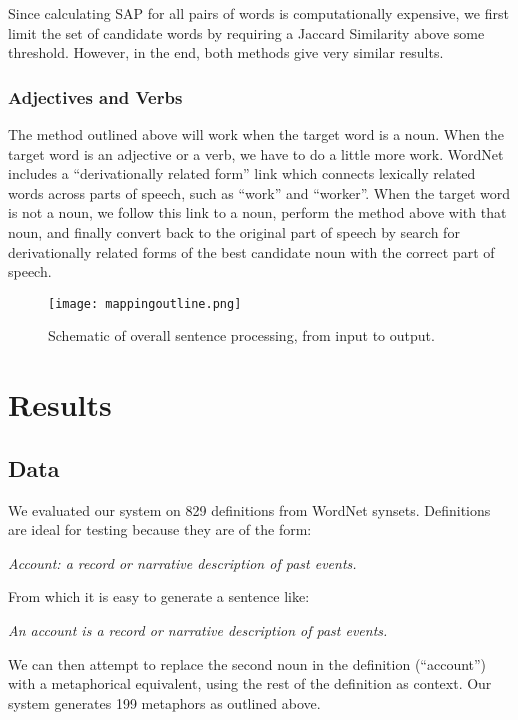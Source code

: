\documentclass[12pt]{article}
\begin{document}
Since calculating SAP for all pairs of words is computationally expensive, we first limit the set of candidate words by requiring a Jaccard Similarity above some threshold. However, in the end, both methods give very similar results.

\subsubsection{Adjectives and Verbs}

The method outlined above will work when the target word is a noun. When the target word is an adjective or a verb, we have to do a little more work. WordNet includes a ``derivationally related form'' link which connects lexically related words across parts of speech, such as ``work'' and ``worker''. When the target word is not a noun, we follow this link to a noun, perform the method above with that noun, and finally convert back to the original part of speech by search for derivationally related forms of the best candidate noun with the correct part of speech.

\begin{figure}[h]
	\centering
	\texttt{[image: mappingoutline.png]}
	\caption{Schematic of overall sentence processing, from input to output.}
	\label{fig:mapoutline}
\end{figure}

\section{Results}

\subsection{Data}
We evaluated our system on 829 definitions from WordNet synsets. Definitions are ideal for testing because they are of the form:

\begin{center}
    \emph{Account: a record or narrative description of past events.}
\end{center}

From which it is easy to generate a sentence like:

\begin{center}
    \emph{An account is a record or narrative description of past events.}
\end{center}

We can then attempt to replace the second noun in the definition (``account'') with a metaphorical equivalent, using the rest of the definition as context. Our system generates 199 metaphors as outlined above.
\end{document}
